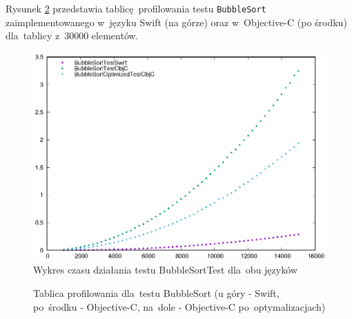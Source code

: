 \documentclass[mgr, shortabstract]{iithesis}
\begin{document}
Rysunek \ref{i:bubble_sort} przedstawia tablicę profilowania testu \texttt{BubbleSort} zaimplementowanego w~języku Swift (na górze) oraz w~Objective-C (po środku) dla~tablicy z~30000 elementów.

\begin{figure}[h]
    \includegraphics{plots/BubbleSort.eps}
    \caption{Wykres czasu działania testu BubbleSortTest dla~obu języków}
    \label{p:bubble_sort}
\end{figure}

\begin{figure}
    \caption{Tablica profilowania dla~testu BubbleSort (u góry - Swift, po~środku - Objective-C, na~dole - Objective-C po~optymalizacjach)}
    \label{i:bubble_sort}
\end{figure}
\end{document}
